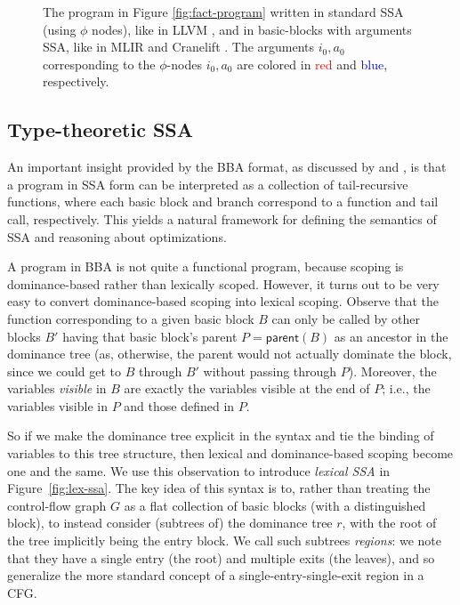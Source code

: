 \documentclass[acmsmall,screen,review]{acmart}
\newcommand{\ms}[1]{\ensuremath{\mathsf{#1}}}
\begin{document}
\begin{figure}
  \caption{
    The program in Figure \ref{fig:fact-program} written in standard SSA (using $\phi$ nodes),
    like in LLVM \cite{llvm}, and in basic-blocks with arguments SSA, like in MLIR \cite{mlir} and
    Cranelift \cite{cranelift}. The arguments $i_0, a_0$ corresponding to the $\phi$-nodes $i_0,
    a_0$ are colored in \textcolor{red}{red} and \textcolor{blue}{blue}, respectively.
  }
  \Description{}
\end{figure}

\subsection{Type-theoretic SSA}

\label{ssec:tt-ssa}

An important insight provided by the BBA format, as discussed by \citet{appel-ssa} and
\citet{kelsey-95-cps}, is that a program in SSA form can be interpreted as a collection
of tail-recursive functions, where each basic block and branch correspond to a function and tail
call, respectively. This yields a natural framework for defining the semantics of SSA and reasoning
about optimizations.

A program in BBA is not quite a functional program, because scoping is dominance-based rather
than lexically scoped. However, it turns out to be very easy to convert dominance-based scoping
into lexical scoping. Observe that the function corresponding to
a given basic block $B$ can only be called by other blocks $B'$ having that basic block's parent $P
= \ms{parent}(B)$ as an ancestor in the dominance tree (as, otherwise, the parent would not actually
dominate the block, since we could get to $B$ through $B'$ without passing through $P$). Moreover,
the variables \emph{visible} in $B$ are exactly the variables visible at the end of $P$; i.e., the
variables visible in $P$ and those defined in $P$.

So if we make the dominance tree explicit in the syntax and tie the binding of variables to this
tree structure, then lexical and dominance-based scoping become one and the same. We use this
observation to introduce \emph{lexical SSA} in Figure~\ref{fig:lex-ssa}. The key idea of this syntax
is to, rather than treating the control-flow graph $G$ as a flat collection of basic blocks (with a
distinguished block), to instead consider (subtrees of) the dominance tree $r$, with the root of the
tree implicitly being the entry block. We call such subtrees \emph{regions}: we note that they have
a single entry (the root) and multiple exits (the leaves), and so generalize the more standard
concept of a single-entry-single-exit region in a CFG.
\end{document}
